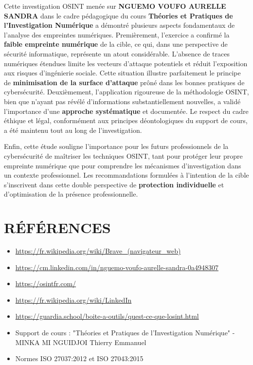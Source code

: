 \documentclass[12pt, a4paper]{article}
\begin{document}
Cette investigation OSINT menée sur \textbf{NGUEMO VOUFO AURELLE SANDRA} dans le cadre pédagogique du cours \textbf{Théories et Pratiques de l'Investigation Numérique} a démontré plusieurs aspects fondamentaux de l'analyse des empreintes numériques.
Premièrement, l'exercice a confirmé la \textbf{faible empreinte numérique} de la cible, ce qui, dans une perspective de sécurité informatique, représente un atout considérable. L'absence de traces numériques étendues limite les vecteurs d'attaque potentiels et réduit l'exposition aux risques d'ingénierie sociale. Cette situation illustre parfaitement le principe de \textbf{minimisation de la surface d'attaque} prôné dans les bonnes pratiques de cybersécurité.
Deuxièmement, l'application rigoureuse de la méthodologie OSINT, bien que n'ayant pas révélé d'informations substantiellement nouvelles, a validé l'importance d'une \textbf{approche systématique} et documentée. Le respect du cadre éthique et légal, conformément aux principes déontologiques du support de cours, a été maintenu tout au long de l'investigation.

Enfin, cette étude souligne l'importance pour les futurs professionnels de la cybersécurité de maîtriser les techniques OSINT, tant pour protéger leur propre empreinte numérique que pour comprendre les mécanismes d'investigation dans un contexte professionnel. Les recommandations formulées à l'intention de la cible s'inscrivent dans cette double perspective de \textbf{protection individuelle} et d'optimisation de la présence professionnelle.

\newpage

\section*{RÉFÉRENCES}

\begin{itemize}
	\item \url{https://fr.wikipedia.org/wiki/Brave_(navigateur_web)}
	\item \url{https://cm.linkedin.com/in/nguemo-voufo-aurelle-sandra-0a4948307}
	\item \url{https://osintfr.com/}
	\item \url{https://fr.wikipedia.org/wiki/LinkedIn}
	\item \url{https://guardia.school/boite-a-outils/quest-ce-que-losint.html}
	\item Support de cours : "Théories et Pratiques de l'Investigation Numérique" - MINKA MI NGUIDJOI Thierry Emmanuel
	\item Normes ISO 27037:2012 et ISO 27043:2015
\end{itemize}
\end{document}
